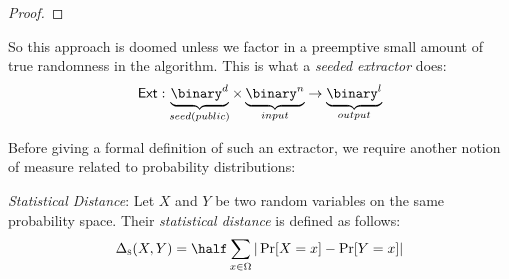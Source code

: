 \begin{proof}

\end{proof}

So this approach is doomed unless we factor in a preemptive small amount of true randomness in the algorithm. This is what a \emph{seeded extractor} does:
\[
    \ext: \underbrace{\binary^d}_{seed(public)}\times \underbrace{\binary^n}_{input} \to \underbrace{\binary^l}_{output}
\]

Before giving a formal definition of such an extractor, we require another notion of measure related to probability distributions:

\begin{definition} \emph{Statistical Distance}:
    Let $X$ and $Y$ be two random variables on the same probability space. Their \emph{statistical distance} is defined as follows:
    \[
        \statdist(X, Y) = \half\sum_{x \in \Omega}|\Pr[X = x] - \Pr[Y = x]|
    \]

\end{definition}

